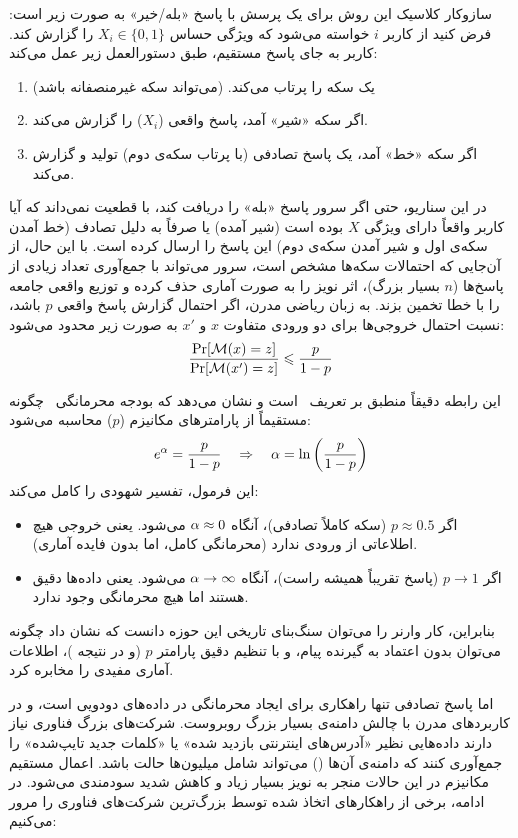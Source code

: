     سازوکار کلاسیک این روش برای یک پرسش با پاسخ «بله/خیر» به صورت زیر است:
    فرض کنید از کاربر $i$ خواسته می‌شود که ویژگی حساس $X_i \in \{0, 1\}$ را گزارش کند. کاربر به جای پاسخ مستقیم، طبق دستورالعمل زیر عمل می‌کند:
    \begin{enumerate}
        \item یک سکه‌ را پرتاب می‌کند.  (می‌تواند سکه غیرمنصفانه باشد)
        \item اگر سکه «شیر» آمد، پاسخ واقعی ($X_i$) را گزارش می‌کند.
        \item اگر سکه «خط» آمد، یک پاسخ تصادفی (با پرتاب سکه‌ی دوم) تولید و گزارش می‌کند.
    \end{enumerate}
    در این سناریو، حتی اگر سرور پاسخ «بله» را دریافت کند، با قطعیت نمی‌داند که آیا کاربر واقعاً دارای ویژگی $X$ بوده است (شیر آمده) یا صرفاً به دلیل تصادف (خط آمدن سکه‌ی اول و شیر آمدن سکه‌ی دوم) این پاسخ را ارسال کرده است. با این حال، از آن‌جایی که احتمالات سکه‌ها مشخص است، سرور می‌تواند با جمع‌آوری تعداد زیادی از پاسخ‌ها ($n$ بسیار بزرگ)، اثر نویز را به صورت آماری حذف کرده و توزیع واقعی جامعه را با خطا تخمین بزند.
     به زبان ریاضی مدرن، اگر احتمال گزارش پاسخ واقعی $p$ باشد، نسبت احتمال خروجی‌ها برای دو ورودی متفاوت $x$ و $x'$ به صورت زیر محدود می‌شود:
\begin{equation}
\frac{\Pr[\mech(x)=z]}{\Pr[\mech(x')=z]} \le \frac{p}{1-p}
\end{equation}

این رابطه دقیقاً منطبق بر تعریف \LDP \ است و نشان می‌دهد که بودجه محرمانگی \al \ چگونه مستقیماً از پارامترهای مکانیزم ($p$) محاسبه می‌شود:
\begin{equation}
e^{\alpha} = \frac{p}{1-p} \quad \Rightarrow \quad \alpha = \ln\left(\frac{p}{1-p}\right)
\end{equation}
این فرمول، تفسیر شهودی  را کامل می‌کند:
\begin{itemize}
    \item اگر $p \approx 0.5$ (سکه کاملاً تصادفی)، آنگاه $\alpha \approx 0$ می‌شود. یعنی خروجی هیچ اطلاعاتی از ورودی ندارد (محرمانگی کامل، اما بدون فایده آماری).
    \item اگر $p \to 1$ (پاسخ تقریباً همیشه راست)، آنگاه $\alpha \to \infty$ می‌شود. یعنی داده‌ها دقیق هستند اما هیچ محرمانگی وجود ندارد.
\end{itemize}
بنابراین، کار وارنر را می‌توان سنگ‌بنای تاریخی این حوزه دانست که نشان داد چگونه می‌توان بدون اعتماد به گیرنده پیام، و با تنظیم دقیق پارامتر $p$ (و در نتیجه \al)، اطلاعات آماری مفیدی را مخابره کرد.

اما پاسخ تصادفی تنها راهکاری برای ایجاد محرمانگی در داده‌های دودویی است، و در کاربردهای مدرن با چالش دامنه‌ی بسیار بزرگ روبروست. شرکت‌های بزرگ فناوری نیاز دارند داده‌هایی نظیر «آدرس‌های اینترنتی بازدید شده» یا «کلمات جدید تایپ‌شده» را جمع‌آوری کنند که دامنه‌ی آن‌ها (\Xset) می‌تواند شامل میلیون‌ها حالت باشد. اعمال مستقیم مکانیزم  در این حالات منجر به نویز بسیار زیاد و کاهش شدید سودمندی می‌شود. در ادامه، برخی از راهکارهای اتخاذ شده توسط بزرگ‌ترین شرکت‌های فناوری را مرور می‌کنیم:

